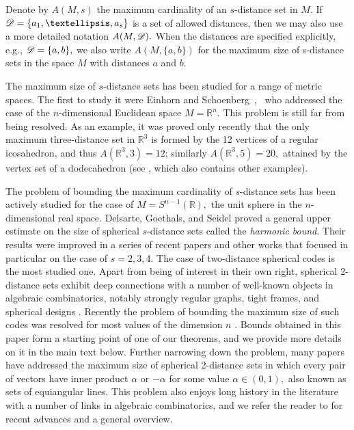 \documentclass{amsart}
\newcommand{\reals}{{\mathbb {R}}}
\begin{document}
Denote by $A(M,s)$ the maximum cardinality of an $s$-distance set in $M$. 
If $\sD=\{a_1,\dots,a_s\}$ is a set of allowed distances, then we may also use a more detailed notation $A(M,\mathscr{D}).$ When the distances are specified explicitly, e.g., $\mathscr{D}=\{a,b\},$ we also write $A(M, \{a,b\})$ for the maximum size of s-distance sets in the space $M$ with distances $a$ and $b$.


The maximum size of $s$-distance sets has been studied for a range of metric spaces. The first to study it were Einhorn and Schoenberg~\cite{ES66I},~\cite{ES66II} who addressed the case of the
$n$-dimensional Euclidean space $M=\reals^n$. This problem is still far from being resolved. As an example, it was proved
only recently that the only maximum three-distance set in $\mathbb{R}^3$ is formed by the 12 vertices of a regular icosahedron, and thus $A(\mathbb{R}^3, 3)=12$; similarly $A(\mathbb{R}^3,5)=20,$ attained by the vertex set of a dodecahedron (see \cite{NozakiShinohara2021}, which also contains other examples). 

The problem of bounding the maximum cardinality of $s$-distance sets has been actively studied for the case of $M=S^{n-1}(\reals),$ the
unit sphere in the $n$-dimensional real space. Delsarte, Goethals, and Seidel \cite{DGS77} proved a general upper estimate
on the size of spherical $s$-distance sets called the {\em harmonic bound}. Their results were improved in a series of recent papers
\cite{M09,Noz11,BM11,MN11,barg2013two,GY18,JTY+20,liu2020semidefinite} and other works that focused in particular on the case of $s=2,3,4$. The case of two-distance 
spherical codes is the most studied one. Apart from being of interest in their own right, spherical 2-distance
sets exhibit deep connections with a number of well-known objects in algebraic combinatorics, notably strongly regular graphs, tight frames, and spherical designs \cite{DGS77,BB05,BGOY15}. Recently the problem of bounding the maximum size of such codes was resolved for most values of the dimension $n$ \cite{GY18}. Bounds obtained in this paper form a starting point of one of our theorems, and we provide more details on it in the main text below. Further narrowing down the problem, many papers
have addressed the maximum size of spherical 2-distance sets in which every pair of vectors have inner product $\alpha$ or $-\alpha$ for some value $\alpha\in(0,1),$ also known as sets of equiangular lines. This problem also enjoys long history in the literature with a 
number of links in algebraic combinatorics, and we refer the reader to \cite{barg2013new,GY18,BDKS18,JTY+21} for recent advances and a general overview.
\end{document}
